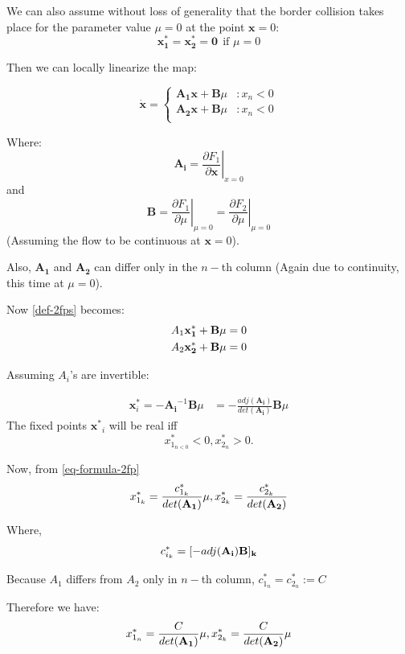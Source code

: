 \documentclass[oneside]{book}
\renewcommand{\(}{\begin{columns}}
\renewcommand{\)}{\end{columns}}
\newcommand{\<}[1]{\begin{column}{#1}}
\renewcommand{\>}{\end{column}}
\newcommand{\mb}[1]{\mathbf{#1}}
\begin{document}
We can also assume without loss of generality that the border collision takes 
place for the parameter value $\mu=0$ at the point $\mb{x}=0$:
\[
\mb{x_1^*}=\mb{x_2^*}=\mb{0}~~\text{if } \mu=0
\]


Then we can locally linearize the map:

\begin{displaymath}
   \dot{\mb{x}} = \left\{
     \begin{array}{lr}
       \mb{A_1x+B}\mu & : x_n<0\\
       \mb{A_2x+B}\mu & : x_n<0\\
     \end{array}
   \right.
\end{displaymath}

Where:\\
\[
\mb{A_i}=\left.  \frac{\partial F_1}{\partial \mb{x}}\right|_{x=0}
\]
and 
\[
\mb{B}=\left.  \frac{\partial F_1}{\partial \mu}\right|_{\mu=0}=\left.  \frac{\partial F_2}{\partial \mu}\right|_{\mu=0}
\]
(Assuming the flow to be continuous at $\mb{x}=0$).

Also, $\mb{A_1}$ and $\mb{A_2}$ can differ only in the $n-$th column (Again 
due to continuity, this time at $\mu=0$).


Now \eqref{def-2fps} becomes:
\begin{align}
A_1\bf{x}^*_1+\bf{B}\mu&=0\\
A_2\bf{x}^*_2+\bf{B}\mu&=0
\end{align}


Assuming $A_i$'s are invertible:

\begin{align}
\label{eq-formula-2fp}
\mb{x}^*_i=-\mb{A_i}^{-1}\mb{B}\mu&=-\frac{adj(\mb{A_i})}{det(\mb{A_i})}\mb{B}\mu
\end{align}
The fixed points $\mb{x^*}_i$ will be real iff
\[
x^*_{1_{n<0}}<0, x^*_{2{_n}}>0. 
\]  

Now, from \eqref{eq-formula-2fp}
\begin{equation}
\label{eq-formula2-2fp}
x^*_{1_k}=\frac{c^*_{1_k}}{det(\bf{A_1})}\mu, x^*_{2_k}=\frac{c^*_{2_k}}{det(\bf{A_2})}
\end{equation}

Where, \[
c^*_{i_k}=[-adj(\bf{A_i)B}]_k
\]

Because $A_1$ differs from $A_2$ only in $n-$th column, $c^*_{1_n}=c^*_{2_n}:=C$

Therefore we have:
\begin{equation}
\label{eq-final-form-2fps}
x^*_{1_n}=\frac{C}{det(\bf{A_1})}\mu, x^*_{2_k}=\frac{C}{det(\bf{A_2})}\mu
\end{equation}
\end{document}
